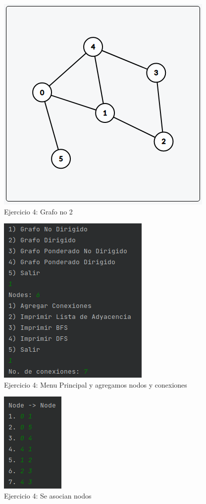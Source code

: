 \documentclass{article}
\begin{document}
			\begin{figure}[H]
				\centering
				\includegraphics[scale = 0.7]{images/e4graph2.png}
				\caption*{Ejercicio 4: Grafo no 2}
			\end{figure}
		
			\begin{figure}[H]
				\centering
				\includegraphics[scale= 0.9]{images/e46.png}
				\caption*{Ejercicio 4: Menu Principal y agregamos nodos y conexiones}
			\end{figure}
			
			\begin{figure}[H]
				\centering
				\includegraphics[scale= 0.9]{images/e47.png}
				\caption*{Ejercicio 4: Se asocian nodos}
			\end{figure}
			
\end{document}
